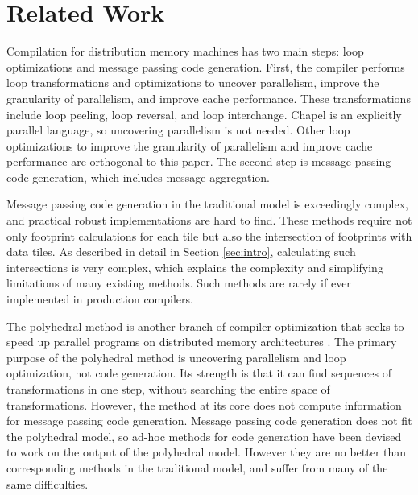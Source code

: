 \section{Related Work}\label{sec:relwork}

Compilation for distribution memory machines has two main steps: loop optimizations and message passing code generation. First, the compiler performs loop transformations and optimizations to uncover parallelism, improve the granularity of parallelism, and improve cache performance. These transformations include loop peeling, loop reversal, and loop interchange. Chapel is an explicitly parallel language, so uncovering parallelism is not needed. Other loop optimizations to improve the granularity of parallelism and improve cache performance are orthogonal to this paper. The second step is message passing code generation, which includes message aggregation.

Message passing code generation in the traditional model is exceedingly complex, and practical robust implementations are hard to find. These methods \cite{xue1997communication,goumas2006message,callahan1988compiling,ramanujam1991compile} require not only footprint calculations for each tile but also the intersection of footprints with data tiles. As described in detail in Section \ref{sec:intro}, calculating such intersections is very complex, which explains the complexity and simplifying limitations of many existing methods. Such methods are rarely if ever implemented in production compilers.

The polyhedral method is another branch of compiler optimization that seeks to speed up parallel programs on distributed memory architectures \cite{Gupta91automaticdata,chavarria2005effective,germain1995automatic, gupta1996compiling, iancu2008performance, wei1998compiling}. The primary purpose of the polyhedral method is uncovering parallelism and loop optimization, not code generation. Its strength is that it can find sequences of transformations in one step, without searching the entire space of transformations. However, the method at its core does not compute information for message passing code generation. Message passing code generation does not fit the polyhedral model, so ad-hoc methods for code generation have been devised to work on the output of the polyhedral model. However they are no better than corresponding methods in the traditional model, and suffer from many of the same difficulties.

\begin{comment}
This writeup is very confusing. You need to clearly state that the method in [15] only works for aggregate array assignments, and not for general affine loops. [This is alluded to, but you need to reword to make this absolutely clear.

Eg: "goes beyond" is ambigious. Goes beyond in what way?
\end{comment}

